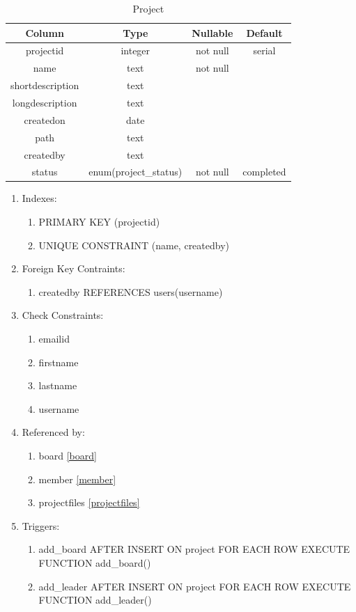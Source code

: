 \documentclass[conference]{IEEEtran}
\begin{document}
\begin{table}[htbp]
  \caption{Project}
  \begin{center}
    \begin{tabular}{|c|c|c|c|}
      \hline
      \textbf{Column} & \textbf{Type} & \textbf{Nullable} & \textbf{Default}\\
      \hline
      projectid & integer & not null & serial\\
      name & text & not null &\\
      shortdescription & text &&\\
      longdescription & text &&\\
      createdon & date &&\\
      path & text &&\\
      createdby & text &&\\
      status & enum(project\_status) & not null & completed\\
      \hline
    \end{tabular}
    \begin{enumerate}
    \item Indexes:
      \begin{enumerate}
      \item PRIMARY KEY (projectid)
      \item UNIQUE CONSTRAINT (name, createdby)
      \end{enumerate}
    \item Foreign Key Contraints:
      \begin{enumerate}
        \item createdby REFERENCES users(username)
      \end{enumerate}
    \item Check Constraints:
      \begin{enumerate}
      \item emailid
      \item firstname
      \item lastname
      \item username
      \end{enumerate}
    \item Referenced by:
      \begin{enumerate}
      \item board \ref{board}
      \item member \ref{member}
      \item projectfiles \ref{projectfiles}
      \end{enumerate}
    \item Triggers:
      \begin{enumerate}
        \item add\_board AFTER INSERT ON project FOR EACH ROW EXECUTE FUNCTION add\_board()
        \item add\_leader AFTER INSERT ON project FOR EACH ROW EXECUTE FUNCTION add\_leader()
      \end{enumerate}
    \end{enumerate}
    \label{project}
  \end{center}
\end{table}
\end{document}
